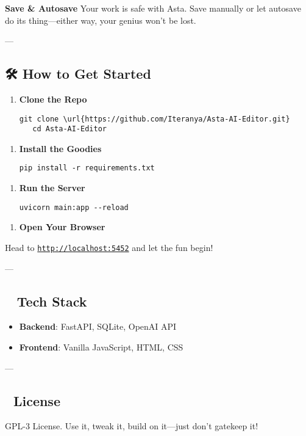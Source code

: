 \documentclass[12pt, a4paper, onecolumn, oneside]{report}
\begin{document}
\textbf{Save & Autosave}
Your work is safe with Asta. Save manually or let autosave do its thing—either way, your genius won’t be lost.

---

\subsection{🛠️ How to Get Started}

\begin{enumerate}
\item \textbf{Clone the Repo}
   \begin{verbatim}
git clone \url{https://github.com/Iteranya/Asta-AI-Editor.git}
   cd Asta-AI-Editor
\end{verbatim}
\end{enumerate}

\begin{enumerate}
\item \textbf{Install the Goodies}
   \begin{verbatim}
pip install -r requirements.txt
\end{verbatim}
\end{enumerate}

\begin{enumerate}
\item \textbf{Run the Server}
   \begin{verbatim}
uvicorn main:app --reload
\end{verbatim}
\end{enumerate}

\begin{enumerate}
\item \textbf{Open Your Browser}
\end{enumerate}
   Head to \texttt{\url{http://localhost:5452}} and let the fun begin!

---

\subsection{🧙‍♂️ Tech Stack}

\begin{itemize}
\item \textbf{Backend}: FastAPI, SQLite, OpenAI API
\item \textbf{Frontend}: Vanilla JavaScript, HTML, CSS
\end{itemize}

---

\subsection{📄 License}

GPL-3 License. Use it, tweak it, build on it—just don’t gatekeep it!
\end{document}
